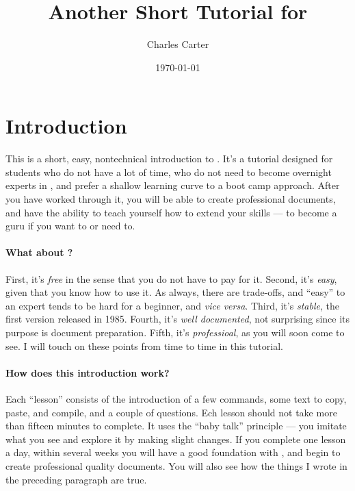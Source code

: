 \documentclass[letterpaper]{article}
\title{Another Short Tutorial for \LaTeXe}
\author{Charles Carter}
\date{\today{}}
\begin{document}
    \maketitle{}
    
    \tableofcontents{}

    \newpage{}

    \section{Introduction}
    \label{Introduction}

    This is a short, easy, nontechnical introduction to \LaTeXe{}. It's a tutorial designed for students who do not have a lot of time, who do not need to become overnight experts in \LaTeXe{}, and prefer a shallow learning curve to a boot camp approach.  After you have worked through it, you will be able to create professional documents, and have the ability to teach yourself how to extend your \LaTeXe{} skills --- to become a \LaTeXe{} guru if you want to or need to.

    \paragraph{What about \LaTeXe{}?}First, it's \textit{free} in the sense that you do not have to pay for it. Second, it's \textit{easy}, given that you know how to use it. As always, there are trade-offs, and ``easy'' to an expert tends to be hard for a beginner, and \textit{vice versa}. Third, it's \textit{stable}, the first version released in 1985. Fourth, it's \textit{well documented}, not surprising since its purpose is document preparation. Fifth, it's \textit{professioal}, as you will soon come to see. I will touch on these points from time to time in this tutorial.

    \paragraph{How does this introduction work?}Each ``lesson'' consists of the introduction of a few commands, some text to copy, paste, and compile, and a couple of questions. Ech lesson should not take more than fifteen minutes to complete. It uses the ``baby talk'' principle --- you imitate what you see and explore it by making slight changes. If you complete one lesson a day, within several weeks you will have a good foundation with \LaTeXe{}, and begin to create professional quality documents. You will also see how the things I wrote in the preceding paragraph are true.
\end{document}

